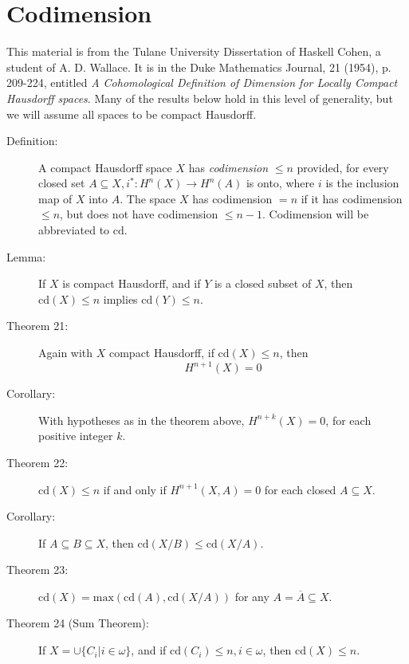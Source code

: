 \documentclass{article}
\begin{document}
\section{Codimension}

This material is from the Tulane University Dissertation of Haskell Cohen, a student of A. D. Wallace. It is in the Duke Mathematics Journal, 21 (1954), p. 209-224, entitled \emph{A Cohomological Definition of Dimension for Locally Compact Hausdorff spaces}. Many of the results below hold in this level of generality, but we will assume all spaces to be compact Hausdorff.

\begin{description}

\item[Definition:] A compact Hausdorff space $X$ has \emph{codimension} $\leq n$ provided, for every closed set $A \subseteq X, i^*: H^n(X) \longrightarrow H^n(A)$ is onto, where $i$ is the inclusion map of $X$ into $A$. The space $X$ has codimension $= n$ if it has codimension $\leq n$, but does not have codimension $\leq n-1$. Codimension will be abbreviated to $\text{cd}$.

\item[Lemma:] If $X$ is compact Hausdorff, and if $Y$ is a closed subset of $X$, then $\text{cd}(X) \leq n$ implies $\text{cd}(Y) \leq n$.

\item[Theorem 21:] Again with $X$ compact Hausdorff, if $\text{cd}(X) \leq n$, then 
  \begin{equation*}
  H^{n+1}(X) = 0
  \end{equation*}

\item[Corollary:] With hypotheses as in the theorem above, $H^{n+k}(X)=0$, for each positive integer $k$.

\item[Theorem 22:] $\text{cd}(X) \leq n$ if and only if $H^{n+1}(X,A)=0$ for each closed $A \subseteq X$.

\item[Corollary:] If $A \subseteq B \subseteq X$, then $\text{cd}(X/B) \leq \text{cd}(X/A)$.

\item[Theorem 23:] $\text{cd}(X) = \text{max}(\text{cd}(A), \text{cd}(X/A))$ for any $A = \overline{A} \subseteq X$.

\item[Theorem 24 (Sum Theorem):] If $X = \cup \{ C_i \vert i \in \omega \}$, and if $\text{cd}(C_i) \leq n,i \in \omega$, then $\text{cd}(X) \leq n$.


\end{description}
\end{document}
